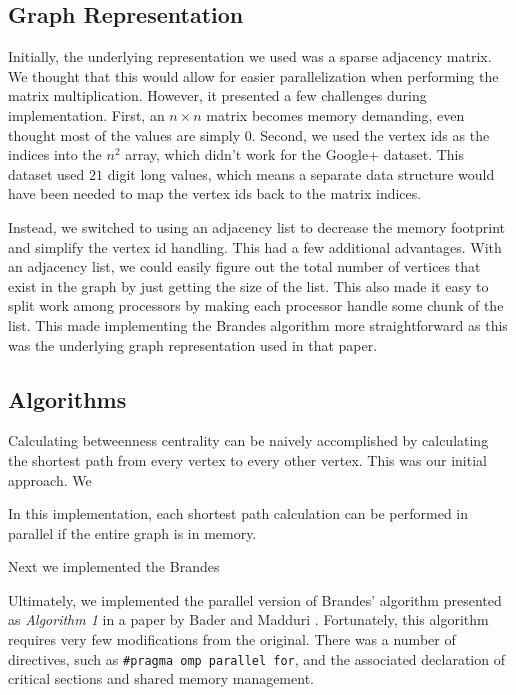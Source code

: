 \documentclass[11pt,a4paper,twocolumn,titlepage]{article}
\begin{document}
\subsection{Graph Representation}

Initially, the underlying representation we used was a sparse adjacency matrix.
We thought that this would allow for easier parallelization when performing the
matrix multiplication. However, it presented a few challenges during
implementation. First, an $n \times n$ matrix becomes memory demanding, even
thought most of the values are simply $0$. Second, we used the vertex ids as
the indices into the $n^2$ array, which didn't work for the Google+ dataset.
This dataset used $21$ digit long values, which means a separate data structure
would have been needed to map the vertex ids back to the matrix indices.

Instead, we switched to using an adjacency list to decrease the memory
footprint and simplify the vertex id handling. This had a few additional
advantages. With an adjacency list, we could easily figure out the total number
of vertices that exist in the graph by just getting the size of the list. This
also made it easy to split work among processors by making each processor
handle some chunk of the list. This made implementing the Brandes algorithm
more straightforward as this was the underlying graph representation used in
that paper.


\subsection{Algorithms}

Calculating betweenness centrality can be naively accomplished by calculating
the shortest path from every vertex to every other vertex. This was our initial
approach. We 

In this
implementation, each shortest path calculation can be performed in parallel if
the entire graph is in memory.

Next we implemented the Brandes

Ultimately, we implemented the parallel version of Brandes' algorithm presented
as \textit{Algorithm 1} in a paper by Bader and Madduri
\cite{bader2006parallel}. Fortunately, this algorithm requires very few
modifications from the original. There was a number of directives, such as
\texttt{\#pragma omp parallel for}, and the associated declaration of critical
sections and shared memory management.
\end{document}
